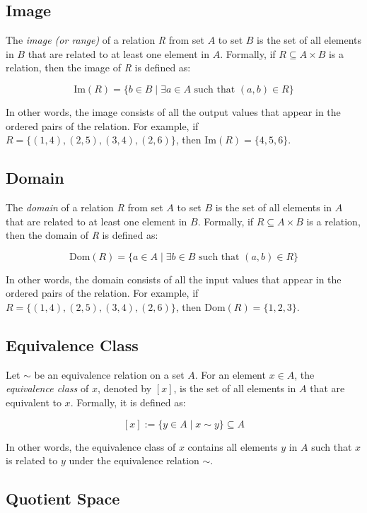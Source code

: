 \subsection{Image}

The \emph{image (or range)} of a relation \emph{R} from set \(A\) to set \(B\) is the set 
of all elements in \(B\) that are related to at least one element in \(A\). Formally, if 
\(R \subseteq A \times B\) is a relation, then the image of \emph{R} is defined as:

\[
	\text{Im}(R) = \{b \in B \mid \exists a \in A \text{ such that } (a,b) \in R\}
\]

In other words, the image consists of all the output values that appear in the ordered pairs of the 
relation. For example, if \(R = \{(1,4), (2,5), (3,4), (2,6)\}\), then \(\text{Im}(R) = \{4, 5, 6\}\).

\subsection{Domain}

The \emph{domain} of a relation \emph{R} from set \(A\) to set \(B\) is the set of all elements in 
\(A\) that are related to at least one element in \(B\). Formally, if \(R \subseteq A \times B\) 
is a relation, then the domain of \emph{R} is defined as:

\[
	\text{Dom}(R) = \{a \in A \mid \exists b \in B \text{ such that } (a,b) \in R\}
\]

In other words, the domain consists of all the input values that appear in the ordered pairs of the 
relation. For example, if \(R = \{(1,4), (2,5), (3,4), (2,6)\}\), then \(\text{Dom}(R) = \{1, 2, 3\}\).

\subsection{Equivalence Class}

Let \(\sim\) be an equivalence relation on a set \(A\). For an element \(x \in A\), the 
\emph{equivalence class} of \(x\), denoted by \([x]\), is the set of all elements in \(A\) that are 
equivalent to \(x\). Formally, it is defined as:

\[
	[x] := \{y \in A \mid x \sim y\} \subseteq A
\]

In other words, the equivalence class of \(x\) contains all elements \(y\) in \(A\) such that 
\(x\) is related to \(y\) under the equivalence relation \(\sim\).

\subsection{Quotient Space}

